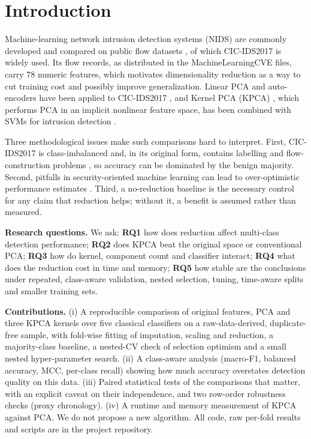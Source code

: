 \documentclass[conference]{IEEEtran}
\begin{document}
\section{Introduction}
Machine-learning network intrusion detection systems (NIDS) are commonly developed and compared on public flow datasets \cite{ring2019}, of which CIC-IDS2017 \cite{sharafaldin2018} is widely used. Its flow records, as distributed in the MachineLearningCVE files, carry 78 numeric features, which motivates dimensionality reduction as a way to cut training cost and possibly improve generalization. Linear PCA and auto-encoders have been applied to CIC-IDS2017 \cite{abdulhammed2019}, and Kernel PCA (KPCA) \cite{scholkopf1998}, which performs PCA in an implicit nonlinear feature space, has been combined with SVMs for intrusion detection \cite{kuang2014}.

Three methodological issues make such comparisons hard to interpret. First, CIC-IDS2017 is class-imbalanced and, in its original form, contains labelling and flow-construction problems \cite{engelen2021,panigrahi2018}, so accuracy can be dominated by the benign majority. Second, pitfalls in security-oriented machine learning can lead to over-optimistic performance estimates \cite{arp2022}. Third, a no-reduction baseline is the necessary control for any claim that reduction helps; without it, a benefit is assumed rather than measured.

\textbf{Research questions.} We ask: \textbf{RQ1} how does reduction affect multi-class detection performance; \textbf{RQ2} does KPCA beat the original space or conventional PCA; \textbf{RQ3} how do kernel, component count and classifier interact; \textbf{RQ4} what does the reduction cost in time and memory; \textbf{RQ5} how stable are the conclusions under repeated, class-aware validation, nested selection, tuning, time-aware splits and smaller training sets.

\textbf{Contributions.} (i) A reproducible comparison of original features, PCA and three KPCA kernels over five classical classifiers on a raw-data-derived, duplicate-free sample, with fold-wise fitting of imputation, scaling and reduction, a majority-class baseline, a nested-CV check of selection optimism and a small nested hyper-parameter search. (ii) A class-aware analysis (macro-F1, balanced accuracy, MCC, per-class recall) showing how much accuracy overstates detection quality on this data. (iii) Paired statistical tests of the comparisons that matter, with an explicit caveat on their independence, and two row-order robustness checks (proxy chronology). (iv) A runtime and memory measurement of KPCA against PCA. We do not propose a new algorithm. All code, raw per-fold results and scripts are in the project repository.
\end{document}
